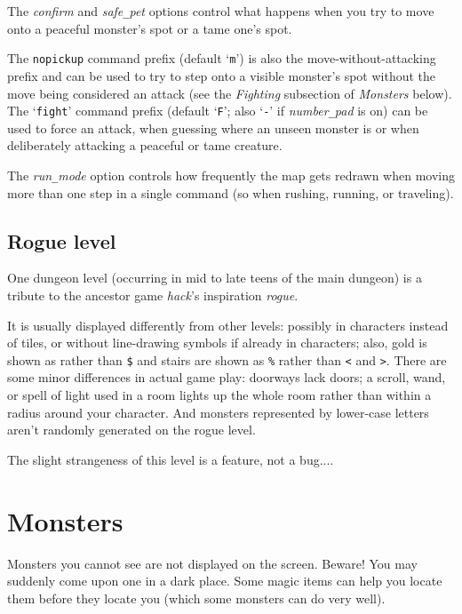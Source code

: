 The
{\it confirm\/}
and
{\it safe\verb+_+pet\/}
options control what happens when you try to move onto a peaceful monster's
spot or a tame one's spot.

The {\tt nopickup} command prefix (default `{\tt m}') is
also the move-without-attacking prefix and can be used to try to step
onto a visible monster's spot without the move being considered an attack
(see the {\it Fighting\/} subsection of {\it Monsters\/} below).
The `{\tt fight}' command prefix (default `{\tt F}';
also `{\tt -}' if
{\it number\verb+_+pad\/}
is on) can be used to force an attack, when guessing where an unseen
monster is or when deliberately attacking a peaceful or tame creature.

The
{\it run\verb+_+mode}
option controls how frequently the map gets redrawn when moving more
than one step in a single command (so when rushing, running, or traveling).

\subsection*{Rogue level}

One dungeon level (occurring in mid to late teens of the main dungeon)
is a tribute to the ancestor game {\it hack}'s inspiration {\it rogue}.

It is usually displayed differently from other levels: possibly in
characters instead of tiles, or without line-drawing symbols if already
in characters; also, gold is shown as {\tt *} rather than {\tt \verb+$+}
and stairs are shown as {\tt \verb+%+} rather than {\tt <} and {\tt >}.
There are some minor differences in actual game play: doorways lack
doors; a scroll, wand, or spell of light used in a room lights up the
whole room rather than within a radius around your character.
And monsters represented by lower-case letters aren't randomly
generated on the rogue level.

The slight strangeness of this level is a feature, not a bug....

\section{Monsters}

Monsters you cannot see are not displayed on the screen.  Beware!
You may suddenly come upon one in a dark place.  Some magic items can
help you locate them before they locate you (which some monsters can do
very well).

